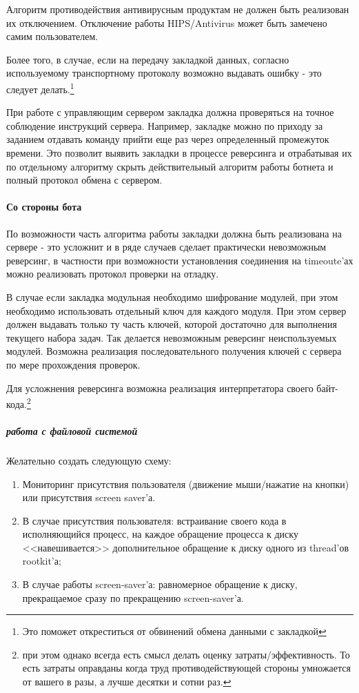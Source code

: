 Алгоритм противодействия антивирусным продуктам не должен быть реализован их отключением.
Отключение работы HIPS/Antivirus может быть замечено самим пользователем.

Более того, в случае, если на передачу закладкой данных, согласно
используемому транспортному протоколу возможно выдавать ошибку - это
следует делать.\footnote{Это поможет откреститься от обвинений обмена
данными с закладкой}

При работе с управляющим сервером закладка должна проверяться на точное
соблюдение инструкций сервера. Например, закладке можно по приходу за
заданием отдавать команду прийти еще раз через определенный промежуток времени.
Это позволит выявить закладки в процессе реверсинга и отрабатывая их по отдельному
алгоритму скрыть действительный алгоритм работы ботнета и полный протокол обмена
с сервером.

\paragraph{Со стороны бота}

По возможности часть алгоритма работы закладки должна быть реализована
на сервере - это усложнит и в ряде случаев сделает практически невозможным реверсинг,
 в частности при возможности установления соединения на timeoute'ах можно
реализовать протокол проверки на отладку.

В случае если закладка модульная необходимо шифрование модулей, при этом необходимо
использовать отдельный ключ для каждого модуля. При этом сервер должен выдавать
только ту часть ключей, которой достаточно для выполнения текущего набора
задач. Так делается невозможным реверсинг неиспользуемых модулей. Возможна
реализация последовательного получения ключей с сервера по мере прохождения
 проверок.

Для усложнения реверсинга возможна реализация интерпретатора своего байт-кода.\footnote{при этом однако всегда есть смысл делать оценку затраты/эффективность. То есть затраты оправданы когда труд противодействующей стороны умножается от вашего в разы, а лучше десятки и сотни раз.}

\subparagraph{работа с файловой системой\\}

Желательно создать следующую схему:

\begin{enumerate}
\item{Мониторинг присутствия пользователя (движение мыши/нажатие на кнопки)
или присутствия screen saver'а.}

\item{В случае присутствия пользователя: встраивание своего кода в
исполняющийся процесс, на каждое обращение процесса к диску
<<навешивается>> дополнительное обращение к диску одного из thread'ов
rootkit'а;
}

\item{В случае работы screen-saver'а: равномерное обращение к диску,
прекращаемое сразу по прекращению  screen-saver'а.}
\end{enumerate}

